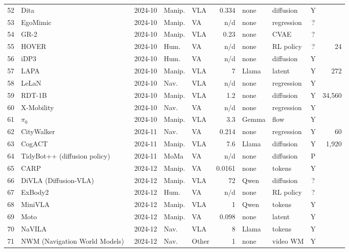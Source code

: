 \begin{longtable}{@{}r p{3.55cm} l l l r l l c r@{}}
52 & Dita~\cite{ax250319757} & 2024-10 & Manip. & VLA & 0.334 & none & diffusion & Y & \\
53 & EgoMimic~\cite{ax241024221} & 2024-10 & Manip. & VA & n/d & none & regression & ? & \\
54 & GR-2~\cite{ax241006158} & 2024-10 & Manip. & VLA & 0.23 & none & CVAE & ? & \\
55 & HOVER~\cite{ax241021229} & 2024-10 & Hum. & VA & n/d & none & RL policy & ? & 24\\
56 & iDP3~\cite{ax241010803} & 2024-10 & Hum. & VA & n/d & none & diffusion & Y & \\
57 & LAPA~\cite{ax241011758} & 2024-10 & Manip. & VLA & 7 & Llama & latent & Y & 272\\
58 & LeLaN~\cite{ax241003603} & 2024-10 & Nav. & VLA & n/d & none & regression & Y & \\
59 & RDT-1B~\cite{ax241007864} & 2024-10 & Manip. & VLA & 1.2 & none & diffusion & Y & 34,560\\
60 & X-Mobility~\cite{ax241017491} & 2024-10 & Nav. & VA & n/d & none & regression & Y & \\
61 & $\pi_0$~\cite{ax241024164} & 2024-10 & Manip. & VLA & 3.3 & Gemma & flow & Y & \\
62 & CityWalker~\cite{ax241117820} & 2024-11 & Nav. & VA & 0.214 & none & regression & Y & 60\\
63 & CogACT~\cite{ax241119650} & 2024-11 & Manip. & VLA & 7.6 & Llama & diffusion & Y & 1,920\\
64 & TidyBot++ (diffusion policy)~\cite{ax241210447} & 2024-11 & MoMa & VA & n/d & none & diffusion & P & \\
65 & CARP~\cite{ax241206782} & 2024-12 & Manip. & VA & 0.0161 & none & tokens & Y & \\
66 & DiVLA (Diffusion-VLA)~\cite{ax241203293} & 2024-12 & Manip. & VLA & 72 & Qwen & diffusion & ? & \\
67 & ExBody2~\cite{ax241213196} & 2024-12 & Hum. & VA & n/d & none & RL policy & ? & \\
68 & MiniVLA~\cite{web-minivla} & 2024-12 & Manip. & VLA & 1 & Qwen & tokens & Y & \\
69 & Moto~\cite{ax241204445} & 2024-12 & Manip. & VA & 0.098 & none & latent & Y & \\
70 & NaVILA~\cite{ax241204453} & 2024-12 & Nav. & VLA & 8 & Llama & tokens & Y & \\
71 & NWM (Navigation World Models)~\cite{ax241203572} & 2024-12 & Nav. & Other & 1 & none & video WM & Y & \\

\end{longtable}
